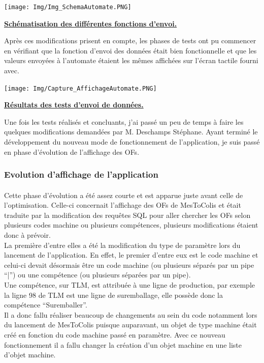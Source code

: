 \documentclass[a4paper,12pt]{extarticle}
\newcommand{\espace}{\vspace{0.3cm}}
\begin{document}
\centerline{\texttt{[image: Img/Img\_SchemaAutomate.PNG]}}
\centerline{\textbf{\underline{Schématisation des différentes fonctions d'envoi.}}}
\espace{}

Après ces modifications prisent en compte, les phases de tests ont pu commencer en vérifiant que la fonction d’envoi des données était bien fonctionnelle et que les valeurs envoyées à l’automate étaient les mêmes affichées sur l’écran tactile fourni avec.\\

\centerline{\texttt{[image: Img/Capture\_AffichageAutomate.PNG]}}
\centerline{\textbf{\underline{Résultats des tests d'envoi de données.}}}
\espace{}

Une fois les tests réalisés et concluants, j’ai passé un peu de temps à faire les quelques modifications demandées par M. Deschamps Stéphane. Ayant terminé le développement du nouveau mode de fonctionnement de l’application, je suis passé en phase d’évolution de l’affichage des OFs.

	\subsubsection{Evolution d’affichage de l’application}
		\paragraph{}
	
	Cette phase d’évolution a été assez courte et est apparue juste avant celle de l’optimisation. Celle-ci concernait l’affichage des OFs de MesToColis et était traduite par la modification des requêtes SQL pour aller chercher les OFs selon plusieurs codes machine ou plusieurs compétences, plusieurs modifications étaient donc à prévoir.\\
La première d'entre elles a été la modification du type de paramètre lors du lancement de l’application. En effet, le premier d’entre eux est le code machine et celui-ci devait désormais être un code machine (ou plusieurs séparés par un pipe “|”) ou une compétence (ou plusieurs séparées par un pipe).\\
Une compétence, sur TLM, est attribuée à une ligne de production, par exemple la ligne 98 de TLM est une ligne de suremballage, elle possède donc la compétence “Suremballer”.\\
Il a donc fallu réaliser beaucoup de changements au sein du code notamment lors du lancement de MesToColis puisque auparavant, un objet de type machine était créé en fonction du code machine passé en paramètre. Avec ce nouveau fonctionnement il a fallu changer la création d’un objet machine en une liste d’objet machine.\\
\end{document}
